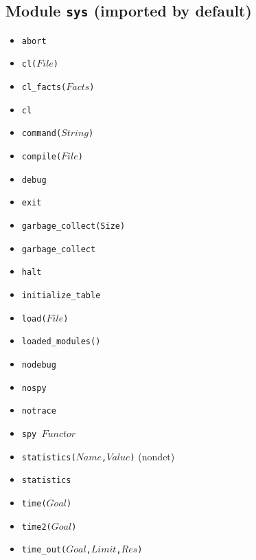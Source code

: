 \documentclass[10pt]{article}
\begin{document}
\begin{multicols}{2}
\section*{Module \texttt{sys} (imported by default)}
\begin{scriptsize}
\begin{itemize}
    \item \texttt{abort}
    \item \texttt{cl($File$)}
    \item \texttt{cl\_facts($Facts$)}
    \item \texttt{cl}
    \item \texttt{command($String$)}
    \item \texttt{compile($File$)}
    \item \texttt{debug}
    \item \texttt{exit} 
    \item \texttt{garbage\_collect(Size)} 
    \item \texttt{garbage\_collect} 
    \item \texttt{halt} 
    \item \texttt{initialize\_table}
    \item \texttt{load($File$)}
    \item \texttt{loaded\_modules()}
    \item \texttt{nodebug}
    \item \texttt{nospy}
    \item \texttt{notrace}
    \item \texttt{spy $Functor$}
    \item \texttt{statistics($Name$,$Value$)} (nondet) 
    \item \texttt{statistics}
    \item \texttt{time($Goal$)}
    \item \texttt{time2($Goal$)} 
    \item \texttt{time\_out($Goal$,$Limit$,$Res$)}

\end{itemize}
\end{scriptsize}
\end{multicols}
\end{document}
